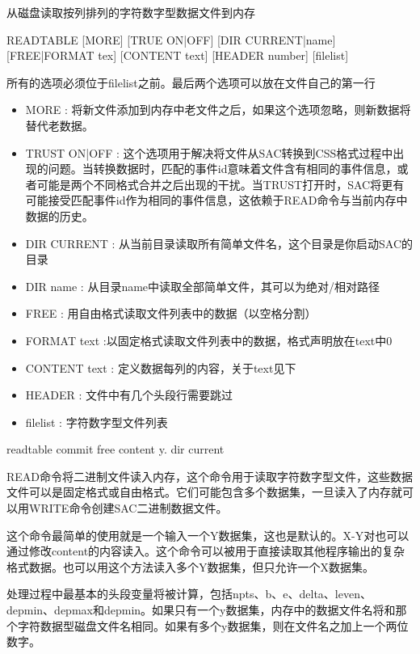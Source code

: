\label{cmd:readtable}

从磁盘读取按列排列的字符数字型数据文件到内存

\begin{SACSTX}
READTABLE [MORE] [TRUE ON|OFF] [DIR CURRENT|name] [FREE|FORMAT tex] 
    [CONTENT text] [HEADER number] [filelist]
\end{SACSTX}
所有的选项必须位于filelist之前。最后两个选项可以放在文件自己的第一行

\begin{itemize}
\item MORE : 将新文件添加到内存中老文件之后，如果这个选项忽略，则新数据将替代老数据。
\item TRUST ON|OFF : 这个选项用于解决将文件从SAC转换到CSS格式过程中出现的问题。当转换数据时，匹配的事件id意味着文件含有相同的事件信息，或者可能是两个不同格式合并之后出现的干扰。当TRUST打开时，SAC将更有可能接受匹配事件id作为相同的事件信息，这依赖于READ命令与当前内存中数据的历史。
\item DIR CURRENT : 从当前目录读取所有简单文件名，这个目录是你启动SAC的目录 
\item DIR name : 从目录name中读取全部简单文件，其可以为绝对/相对路径 
\item FREE : 用自由格式读取文件列表中的数据（以空格分割）
\item FORMAT text :以固定格式读取文件列表中的数据，格式声明放在text中0 
\item CONTENT text : 定义数据每列的内容，关于text见下 
\item HEADER : 文件中有几个头段行需要跳过 
\item filelist : 字符数字型文件列表
\end{itemize}

\begin{SACDFT}
readtable commit free content y. dir current
\end{SACDFT}

READ命令将二进制文件读入内存，这个命令用于读取字符数字型文件，这些数据文件可以是固定格式或自由格式。它们可能包含多个数据集，一旦读入了内存就可以用WRITE命令创建SAC二进制数据文件。

这个命令最简单的使用就是一个输入一个Y数据集，这也是默认的。X-Y对也可以通过修改content的内容读入。这个命令可以被用于直接读取其他程序输出的复杂格式数据。也可以用这个方法读入多个Y数据集，但只允许一个X数据集。

处理过程中最基本的头段变量将被计算，包括npts、b、e、delta、leven、depmin、depmax和depmin。如果只有一个y数据集，内存中的数据文件名将和那个字符数据型磁盘文件名相同。如果有多个y数据集，则在文件名之加上一个两位数字。	

